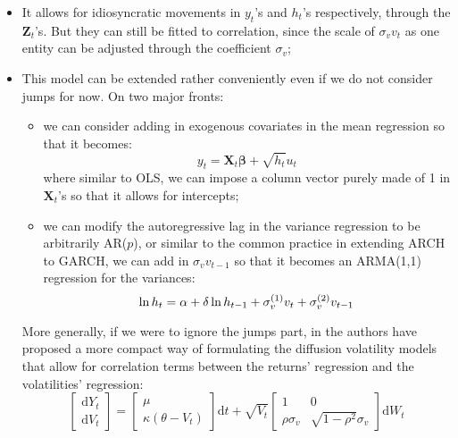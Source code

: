 \documentclass[letterpaper]{article}
\newcommand{\df}{\mathrm{d}}
\newcommand{\XX}{\mathbf{X}}
\newcommand{\ZZ}{\mathbf{Z}}
\begin{document}
	\begin{itemize}
		\item It allows for idiosyncratic movements in $y_t$'s and $h_t$'s respectively, through the $\ZZ_t$'s. But they can still be fitted to correlation, since the scale of $\sigma_v v_t$ as one entity can be adjusted through the coefficient $\sigma_v$;
		\item This model can be extended rather conveniently even if we do not consider jumps for now. On two major fronts:
		\begin{itemize}
			\item we can consider adding in exogenous covariates in the mean regression so that it becomes:
			\begin{equation}
			y_t=\XX_t\bm{\beta}+\sqrt{h_t}u_t
			\end{equation}
			where similar to OLS, we can impose a column vector purely made of 1 in $\XX_t$'s so that it allows for intercepts;
			\item we can modify the autoregressive lag in the variance regression to be arbitrarily AR($p$), or similar to the common practice in extending ARCH to GARCH, we can add in $\sigma_v v_{t-1}$ so that it becomes an ARMA(1,1) regression for the variances:
			\begin{equation}
			\ln h_t=\alpha+\delta\ln h_{t-1}+\sigma_v^{(1)}v_t+\sigma_v^{(2)}v_{t-1}\\
			\end{equation}
		\end{itemize}
		More generally, if we were to ignore the jumps part, in \cite{polson2003jumps} the authors have proposed a more compact way of formulating the diffusion volatility models that allow for correlation terms between the returns' regression and the volatilities' regression:
		\begin{equation}\label{SVMatWithoutJumps}
		\begin{bmatrix}
		\df Y_t\\
		\df V_t
		\end{bmatrix} = 
		\begin{bmatrix}
		\mu\\
		\kappa(\theta-V_t)
		\end{bmatrix}\df t+
		\sqrt{V_t}\begin{bmatrix}
		1 & 0 \\
		\rho\sigma_v &\sqrt{1-\rho^2}\sigma_v
		\end{bmatrix}\df W_t
		\end{equation}
	\end{itemize}
\end{document}
